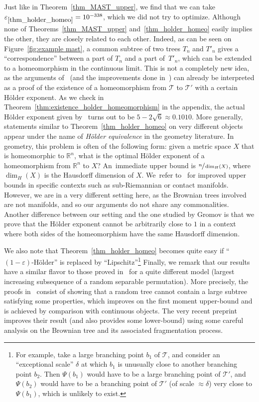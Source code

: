 \documentclass[JEP,XML,SOM,Unicode,NoFloatCountersInSection,published]{cedram}
\newcommand{\Tt}{\mathcal{T}}
\let\eps\varepsilon
\theoremstyle{plain}
\theoremstyle{definition}
\begin{document}
Just like in Theorem~\ref{thm_MAST_upper}, we find that we can take $\eps_{\ref{thm_holder_homeo}}=10^{-338}$, which we did not try to optimize.
Although none of Theorems~\ref{thm_MAST_upper} and~\ref{thm_holder_homeo} easily implies the other, they are closely related to each other.
Indeed, as can be seen on Figure~\ref{fig:example mast}, a common subtree of two trees $T_n$ and $T'_n$ gives a ``correspondence'' between a part of $T_n$ and a part of~$T'_n$, which can be extended to a homeomorphism in the continuous limit.
This is not a completely new idea, as the arguments of~\cite{aldous_largest_2022} (and the improvements done in~\cite{Khez22}) can already be interpreted as a proof of the existence of a homeomorphism from $\Tt$ to $\Tt'$ with a certain Hölder exponent.
As we check in Theorem~\ref{thm:existence_holder_homeomorphism} in the appendix, the actual Hölder exponent given by~\cite{aldous_largest_2022} turns out to be $5-2\sqrt{6}\approx 0.1010$.
More generally, statements similar to Theorem~\ref{thm_holder_homeo} on very different objects appear under the name of \emph{Hölder equivalence} in the geometry literature.
In geometry, this problem is often of the following form: given a metric space $X$ that is homeomorphic to $\mathbb{R}^n$, what is the optimal Hölder exponent of a homeomorphism from $\mathbb{R}^n$ to $X$?
An~immediate upper bound is $\sfrac{n}{\dim_H(X)}$, where $\dim_H(X)$ is the Hausdorff dimension of $X$.
We~refer to~\cite{Gromov96} for improved upper bounds in specific contexts such as sub-Riemannian or contact manifolds.
However, we are in a very different setting here, as the Brownian trees involved are not manifolds, and so our arguments do not share any commonalities.
Another difference between our setting and the one studied by Gromov is that we prove that the Hölder exponent cannot be arbitrarily close to $1$ in a context where both sides of the homeomorphism have the same Hausdorff dimension.\enlargethispage{\baselineskip}%

We also note that Theorem~\ref{thm_holder_homeo} becomes quite easy if ``$(1-\eps)$-Hölder'' is replaced by ``Lipschitz''\footnote{For example, take a large branching point $b_1$ of $\Tt$, and consider an ``exceptional scale'' $\delta$ at which $b_1$ is unusually close to another branching point $b_2$.
Then $\Psi(b_1)$ would have to be a large branching point of $\Tt'$, and $\Psi(b_2)$ would have to be a branching point of $\Tt'$ (of scale $\approx \delta$) very close to $\Psi(b_1)$, which is unlikely to exist.}
Finally, we remark that our results have a similar flavor to those proved in~\cite[Th.\,1.2, Th.\,1.7]{BBDFGMP22} for a quite different model (largest increasing subsequence of a random separable permutation). More precisely, the proofs in~\cite{BBDFGMP22} consist of showing that a random tree cannot contain a large subtree satisfying some properties, which improves on the first moment upper-bound and is achieved by comparison with continuous objects.
The very recent preprint \cite{borga_power_2023} improves their result (and also provides some lower-bound) using some careful analysis on the Brownian tree and its associated fragmentation process.
\end{document}
